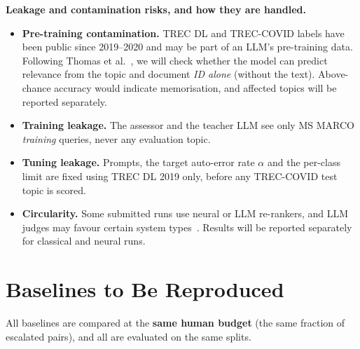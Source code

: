 \documentclass[11pt,a4paper]{article}
\begin{document}
\textbf{Leakage and contamination risks, and how they are handled.}
\begin{itemize}
  \item \textbf{Pre-training contamination.} TREC DL and TREC-COVID labels have been public since 2019--2020 and may be part of an LLM's pre-training data. Following Thomas et al.~\cite{thomas2024}, we will check whether the model can predict relevance from the topic and document \emph{ID alone} (without the text). Above-chance accuracy would indicate memorisation, and affected topics will be reported separately.
  \item \textbf{Training leakage.} The assessor and the teacher LLM see only MS MARCO \emph{training} queries, never any evaluation topic.
  \item \textbf{Tuning leakage.} Prompts, the target auto-error rate $\alpha$ and the per-class limit are fixed using TREC DL 2019 only, before any TREC-COVID test topic is scored.
  \item \textbf{Circularity.} Some submitted runs use neural or LLM re-rankers, and LLM judges may favour certain system types~\cite{alaofi2026}. Results will be reported separately for classical and neural runs.
\end{itemize}

\section{Baselines to Be Reproduced}
All baselines are compared at the \textbf{same human budget} (the same fraction of escalated pairs), and all are evaluated on the same splits.
\end{document}
